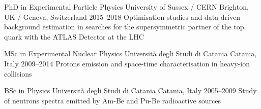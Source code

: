 






\begin{cventries}

  \cventry
      {PhD in Experimental Particle Physics}
      {University of Sussex / CERN}
      {Brighton, UK / Geneva, Switzerland}
      {2015--2018}
      {Optimisation studies and data-driven background estimation in searches for the 
      supersymmetric partner of the top quark with the ATLAS Detector at the LHC}

  \cventry
      {MSc in Experimental Nuclear Physics}
      {Università degli Studi di Catania}
      {Catania, Italy}
      {2009--2014}
      {Protons emission and space-time characterisation in heavy-ion collisions}
      
  \cventry
      {BSc in Physics}
      {Università degli Studi di Catania}
      {Catania, Italy}
      {2005--2009}
      {Study of neutrons spectra emitted by Am-Be and Pu-Be radioactive sources}
\end{cventries}


